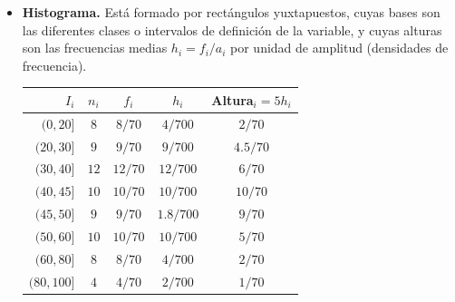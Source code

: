 \documentclass[]{article}
\begin{document}
	\begin{itemize}
		\item \textbf{Histograma. }Está formado por rectángulos yuxtapuestos, cuyas bases son las diferentes clases o intervalos de definición de la variable, y cuyas alturas son las frecuencias medias $h_i = f_i/a_i$ por unidad de amplitud (densidades de frecuencia).
		
		\begin{minipage}[t]{.53\linewidth}
			\raggedleft
			\vspace*{0pt}
			\begin{center}
				\begin{tabular}{|r | c | c | c | c |}
					\hline
					$I_i$ & $n_i$ & $f_i$ & $h_i$ & Altura$_i = 5h_i$ \\ \hline
					$(0, 20]$ & $8$ & $8/70$ & $4/700$ & $2/70$ \\
					$(20, 30]$ & $9$ & $9/70$ & $9/700$ & $4.5/70$ \\
					$(30, 40]$ & $12$ & $12/70$ & $12/700$ & $6/70$ \\
					$(40, 45]$ & $10$ & $10/70$ & $10/700$ & $10/70$ \\
					$(45, 50]$ & $9$ & $9/70$ & $1.8/700$ & $9/70$ \\
					$(50, 60]$ & $10$ & $10/70$ & $10/700$ & $5/70$ \\
					$(60, 80]$ & $8$ & $8/70$ & $4/700$ & $2/70$ \\
					$(80, 100]$ & $4$ & $4/70$ & $2/700$ & $1/70$ \\
					\hline
				\end{tabular}
			\end{center}
			

\end{minipage}
\end{itemize}
\end{document}
